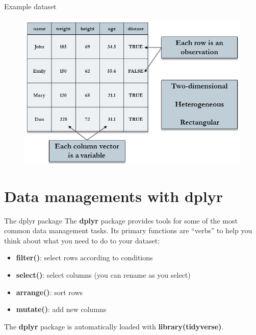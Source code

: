 \documentclass[
  ignorenonframetext,
]{beamer}
\providecommand{\tightlist}{%
  \setlength{\itemsep}{0pt}\setlength{\parskip}{0pt}}
\begin{document}
\begin{frame}{Example dataset}
\protect\hypertarget{example-dataset}{}
\begin{figure}
\includegraphics[width=.9\linewidth]{images/dataset.png}
\end{figure}
\end{frame}

\hypertarget{data-managements-with-dplyr}{%
\section{Data managements with
dplyr}\label{data-managements-with-dplyr}}

\begin{frame}{The dplyr package}
\protect\hypertarget{the-dplyr-package}{}
The \textbf{dplyr} package provides tools for some of the most common
data management tasks. Its primary functions are ``verbs'' to help you
think about what you need to do to your dataset:

\begin{itemize}
\tightlist
\item
  \textbf{filter()}: select rows according to conditions
\item
  \textbf{select()}: select columns (you can rename as you select)
\item
  \textbf{arrange()}: sort rows
\item
  \textbf{mutate()}: add new columns
\end{itemize}

The \textbf{dplyr} package is automatically loaded with
\textbf{library(tidyverse)}.
\end{frame}
\end{document}
